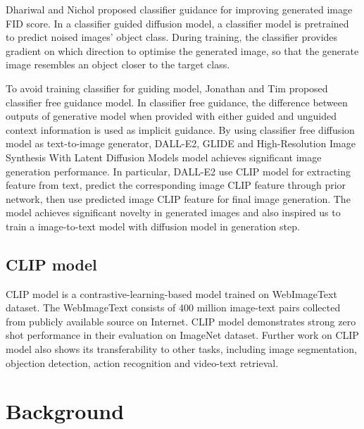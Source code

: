 \documentclass{article}
\begin{document}
Dhariwal and Nichol \cite{diffuseBeatGan} proposed classifier guidance for improving generated image FID score. In a classifier guided diffusion model, a classifier model is pretrained to predict noised images' object class. During training, the classifier provides gradient on which direction to optimise the generated image, so that the generate image resembles an object closer to the target class. 

To avoid training classifier for guiding model, Jonathan and Tim \cite{classifier-free} proposed classifier free guidance model. In classifier free guidance, the difference between outputs of generative model when provided with either guided and unguided context information is used as implicit guidance. By using classifier free diffusion model as text-to-image generator, DALL-E2\cite{dalle2}, GLIDE\cite{glide} and High-Resolution Image Synthesis With Latent Diffusion Models\cite{high-resolution-image-synthesis} model achieves significant image generation performance. In particular, DALL-E2 use CLIP model for extracting feature from text, predict the corresponding image CLIP feature through prior network, then use predicted image CLIP feature for final image generation. The model achieves significant novelty in generated images and also inspired us to train a image-to-text model with diffusion model in generation step.

\subsection{CLIP model}
CLIP model is a contrastive-learning-based model trained on WebImageText dataset. The WebImageText consists of 400 million image-text pairs collected from publicly available source on Internet. CLIP model demonstrates strong zero shot performance in their evaluation on ImageNet\cite{imagenet} dataset. Further work on CLIP model also shows its transferability to other tasks, including image segmentation\cite{lseg, groupvit}, objection detection\cite{vild, glip}, action recognition\cite{clip4clip} and video-text retrieval\cite{actionclip}. 

\section{Background}
\end{document}
